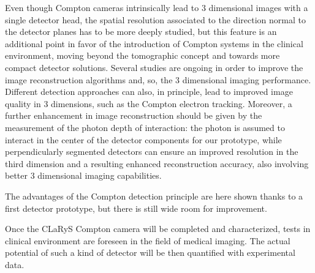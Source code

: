 Even though Compton cameras intrinsically lead to 3 dimensional images with a single detector head, the spatial resolution associated to the direction normal to the detector planes has to be more deeply studied, but this feature is an additional point in favor of the introduction of Compton systems in the clinical environment, moving beyond the tomographic concept and towards more compact detector solutions. Several studies are ongoing in order to improve the image reconstruction algorithms and, so, the 3 dimensional imaging performance\cite{Kuchment:2016uiw}. Different detection approaches can also, in principle, lead to improved image quality in 3 dimensions, such as the Compton electron tracking\cite{7582015, KABUKI20071031}. Moreover, a further enhancement in image reconstruction should be given by the measurement of the photon depth of interaction: the photon is assumed to interact in the center of the detector components for our prototype, while perpendicularly segmented detectors can ensure an improved resolution in the third dimension and a resulting enhanced reconstruction accuracy, also involving better 3 dimensional imaging capabilities. 

The advantages of the Compton detection principle are here shown thanks to a first detector prototype, but there is still wide room for improvement.       

Once the CLaRyS Compton camera will be completed and characterized, tests in clinical environment are foreseen in the field of medical imaging. The actual potential of such a kind of detector will be then quantified with experimental data.

\clearpage
